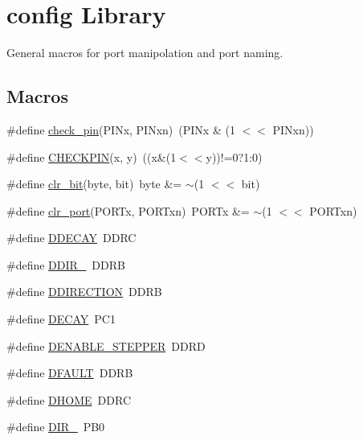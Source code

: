 \hypertarget{group__biba__config}{\section{config Library}
\label{group__biba__config}
}


General macros for port manipolation and port naming.  


\subsection*{Macros}
\begin{DoxyCompactItemize}
\item 
\#define \hyperlink{group__biba__config_ga65a9fed63ff97399d2b08295253076f3}{check\-\_\-pin}(P\-I\-Nx, P\-I\-Nxn)~(P\-I\-Nx \& (1 $<$$<$ P\-I\-Nxn))
\item 
\#define \hyperlink{group__biba__config_ga1d47feb8b05cf197117763115ac90485}{C\-H\-E\-C\-K\-P\-I\-N}(x, y)~((x\&(1$<$$<$y))!=0?1\-:0)
\item 
\#define \hyperlink{group__biba__config_gaf2f231c38a29a96bac24f174fe7bf8b0}{clr\-\_\-bit}(byte, bit)~byte \&= $\sim$(1 $<$$<$ bit)
\item 
\#define \hyperlink{group__biba__config_ga984f41d756890774ffc7ce744024a000}{clr\-\_\-port}(P\-O\-R\-Tx, P\-O\-R\-Txn)~P\-O\-R\-Tx \&= $\sim$(1 $<$$<$ P\-O\-R\-Txn)
\item 
\#define \hyperlink{group__biba__config_ga4280725e4eff1145eac3e34c574b8383}{D\-D\-E\-C\-A\-Y}~D\-D\-R\-C
\item 
\#define \hyperlink{group__biba__config_gab2a611474dce8378023836a4c5e07b3a}{D\-D\-I\-R\-\_}~D\-D\-R\-B
\item 
\#define \hyperlink{group__biba__config_ga75cfe7b50065d13aa41a1b28815b78df}{D\-D\-I\-R\-E\-C\-T\-I\-O\-N}~D\-D\-R\-B
\item 
\#define \hyperlink{group__biba__config_ga9d211c41bcae2aa62028a3645c63cf8a}{D\-E\-C\-A\-Y}~P\-C1
\item 
\#define \hyperlink{group__biba__config_ga11a7f88811704d85bf9e6e88e5b4a13a}{D\-E\-N\-A\-B\-L\-E\-\_\-\-S\-T\-E\-P\-P\-E\-R}~D\-D\-R\-D
\item 
\#define \hyperlink{group__biba__config_ga6b14a46014e8d8efa630e7df0f08b368}{D\-F\-A\-U\-L\-T}~D\-D\-R\-B
\item 
\#define \hyperlink{group__biba__config_ga80ca054824bc462b54a3fcfdf7f6be87}{D\-H\-O\-M\-E}~D\-D\-R\-C
\item 
\#define \hyperlink{group__biba__config_ga251b49d43197436ec9943946734a7945}{D\-I\-R\-\_}~P\-B0

\end{DoxyCompactItemize}
